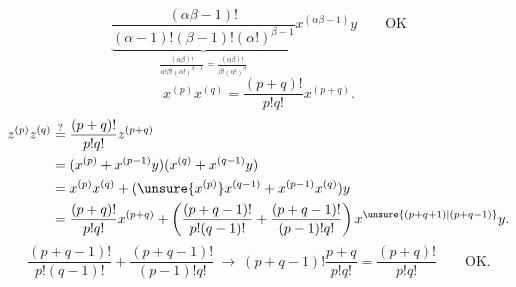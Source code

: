 {\[\]
\[
\underbrace{\frac{(\alpha\beta-1)!}
 {(\alpha-1)!(\beta-1)!(\alpha!)^{\beta-1}}}_{
 \frac{(\alpha\beta)!}{\alpha!\beta!(\alpha!)^{\beta-1}}
 =\frac{(\alpha\beta)!}{\beta!(\alpha!)^\beta}}
 x^{(\alpha\beta-1)}y\qquad\mathrm{OK}
\]
\[
x^{(p)}x^{(q)}=\frac{(p+q)!}{p!q!}x^{(p+q)}.
\]
\[
\begin{aligned}
z^{(p)}z^{(q)}&\overset?=\frac{(p+q)!}{p!q!}z^{(p+q)}\\
 &=(x^{(p)}+x^{(p-1)}y)(x^{(q)}+x^{(q-1)}y)\\
 &=x^{(p)}x^{(q)}+(\unsure{x^{(p)}}x^{(q-1)}+x^{(p-1)}x^{(q)})y\\
 &=\frac{(p+q)!}{p!q!}x^{(p+q)}+
 \left(\frac{(p+q-1)!}{p!(q-1)!}+
 \frac{(p+q-1)!}{(p-1)!q!}\right)x^{\unsure{(p+q+1)|(p+q-1)}}y.
\end{aligned}
\]
\[
\frac{(p+q-1)!}{p!(q-1)!}+\frac{(p+q-1)!}{(p-1)!q!}
 \ \longrightarrow\ 
 (p+q-1)!\frac{p+q}{p!q!}=\frac{(p+q)!}{p!q!}\qquad\mathrm{OK}.
\]
}
